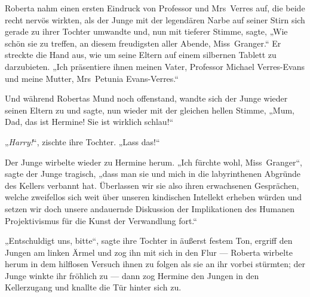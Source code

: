Roberta nahm einen ersten Eindruck von Professor und Mrs~Verres auf, die beide recht nervös wirkten, als der Junge mit der legendären Narbe auf seiner Stirn sich gerade zu ihrer Tochter umwandte und, nun mit tieferer Stimme, sagte,
„Wie schön sie zu treffen, an diesem freudigsten aller Abende, Miss~Granger.“ Er streckte die Hand aus, wie um seine Eltern auf einem silbernen Tablett zu darzubieten.
„Ich präsentiere ihnen meinen Vater, Professor Michael Verres-Evans und meine Mutter, Mrs~Petunia Evans-Verres.“

Und während Robertas Mund noch offenstand, wandte sich der Junge wieder seinen Eltern zu und sagte, nun wieder mit der gleichen hellen Stimme,
„Mum, Dad, das ist Hermine! Sie ist wirklich schlau!“

„\emph{Harry!}“, zischte ihre Tochter.
„Lass das!“

Der Junge wirbelte wieder zu Hermine herum.
„Ich fürchte wohl, Miss~Granger“, sagte der Junge tragisch, „dass man sie und mich in die labyrinthenen Abgründe des Kellers verbannt hat. Überlassen wir sie also ihren erwachsenen Gesprächen, welche zweifellos sich weit über unseren kindischen Intellekt erheben würden und setzen wir doch unsere andauernde Diskussion der Implikationen des Humanen Projektivismus für die Kunst der Verwandlung fort.“

„Entschuldigt uns, bitte“, sagte ihre Tochter in äußerst festem Ton, ergriff den Jungen am linken Ärmel und zog ihn mit sich in den Flur — Roberta wirbelte herum in dem hilflosen Versuch ihnen zu folgen als sie an ihr vorbei stürmten; der Junge winkte ihr fröhlich zu — dann zog Hermine den Jungen in den Kellerzugang und knallte die Tür hinter sich zu.

